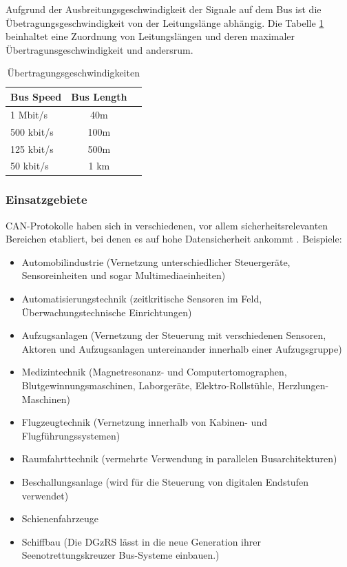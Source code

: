 Aufgrund der Ausbreitungsgeschwindigkeit der Signale auf dem Bus ist die 
Übetragungsgeschwindigkeit von der Leitungslänge abhängig. Die Tabelle 
\ref{tab:speed} beinhaltet eine Zuordnung von Leitungslängen und deren 
maximaler Übertragunsgeschwindigkeit und andersrum.

\begin{table}[h]
	\centering
	\begin{tabular}{lcr}
		Bus Speed & Bus Length \\
		\hline
		1 Mbit/s & 40m \\
		500 kbit/s & 100m \\
		125 kbit/s & 500m \\
		50 kbit/s & 1 km \\
	\end{tabular}
	\label{tab:speed}
	\caption{Übertragungsgeschwindigkeiten}
\end{table}

\subsubsection{Einsatzgebiete}

CAN-Protokolle haben sich in verschiedenen, vor allem sicherheitsrelevanten 
Bereichen etabliert, bei denen es auf hohe Datensicherheit ankommt 
\citep[nach][]{WI1}. Beispiele:

\begin{itemize}
\item Automobilindustrie (Vernetzung unterschiedlicher Steuergeräte, Sensoreinheiten 
und sogar Multimediaeinheiten)
\item Automatisierungstechnik (zeitkritische Sensoren im Feld, Überwachungstechnische 
Einrichtungen)
\item Aufzugsanlagen (Vernetzung der Steuerung mit verschiedenen Sensoren, Aktoren 
und Aufzugsanlagen untereinander innerhalb einer Aufzugsgruppe)
\item Medizintechnik (Magnetresonanz- und Computertomographen, Blutgewinnungsmaschinen,
 Laborgeräte, Elektro-Rollstühle, Herzlungen-Maschinen)
\item Flugzeugtechnik (Vernetzung innerhalb von Kabinen- und Flugführungssystemen)
\item Raumfahrttechnik (vermehrte Verwendung in parallelen Busarchitekturen)
\item Beschallungsanlage (wird für die Steuerung von digitalen Endstufen verwendet)
\item Schienenfahrzeuge
\item Schiffbau (Die DGzRS lässt in die neue Generation ihrer Seenotrettungskreuzer 
Bus-Systeme einbauen.)
\end{itemize}

